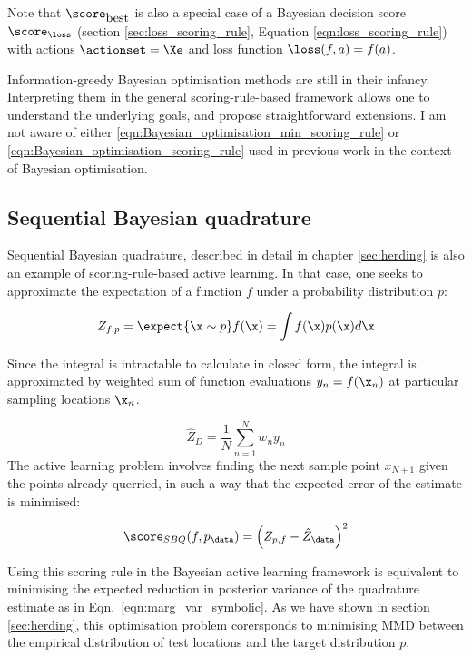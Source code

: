 Note that $\score_{\mbox{best}}$ is also a special case of a Bayesian decision score $\score_{\loss}$ (section \ref{sec:loss_scoring_rule}, Equation \eqref{eqn:loss_scoring_rule}) with actions $\actionset=\Xe$ and loss function $\loss(f,a)=f(a)$.

Information-greedy Bayesian optimisation methods are still in their infancy. Interpreting them in the general scoring-rule-based framework allows one to understand the underlying goals, and propose straightforward extensions. I am not aware of either \eqref{eqn:Bayesian_optimisation_min_scoring_rule} or \eqref{eqn:Bayesian_optimisation_scoring_rule} used in previous work in the context of Bayesian optimisation.

\subsection{Sequential Bayesian quadrature}

Sequential Bayesian quadrature, described in detail in chapter \ref{sec:herding} is also an example of scoring-rule-based active learning. In that case, one seeks to approximate the expectation of a function $f$ under a probability distribution $p$:

\begin{equation}
	Z_{f,p} = \expect{\x\sim p}f(\x) = \int f(\x) p(\x) d\x
\end{equation}

Since the integral is intractable to calculate in closed form, the integral is approximated by weighted sum of function evaluations $y_n = f(\x_n)$ at particular sampling locations $\x_n$.

\begin{equation}
	\hat{Z}_{D} = \frac{1}{N}\sum_{n=1}^{N} w_n y_n
\end{equation}
 The active learning problem involves finding the next sample point $x_{N+1}$ given the points already querried, in such a way that the expected error of the estimate is minimised:

\begin{equation}
	\score_{SBQ}(f,p_\data) = \left(Z_{p,f} - \hat{Z}_\data \right)^2
\end{equation}

Using this scoring rule in the Bayesian active learning framework is equivalent to minimising the expected reduction in posterior variance of the quadrature estimate as in Eqn.\ \eqref{eqn:marg_var_symbolic}. As we have shown in section \ref{sec:herding}, this optimisation problem corersponds to minimising MMD between the empirical distribution of test locations and the target distribution $p$.


